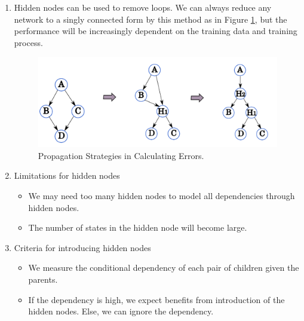 \documentclass[12pt,twoside]{article}
\begin{document}
\begin{enumerate}
\begin{enumerate}
	\end{enumerate}


\item  Hidden nodes can be used to remove loops. We can always reduce any network to a singly connected form by this method as in Figure \ref{fig:ReduceLoops}, but the performance will be increasingly dependent on the training data and training process. 

\begin{figure}[H]		
	\begin{center}
		\includegraphics[width = 0.5\hsize]{./figures/ReducingLoopsFinal.png} 
			\caption{Propagation Strategies in Calculating Errors.}
		\label{fig:ReduceLoops} %
	\end{center}
\end{figure}	

\item Limitations for hidden nodes
	\begin{itemize}
		\item We may need too many hidden nodes to model all dependencies through hidden nodes.
		\item The number of states in the hidden node will become large.
	\end{itemize}

\item Criteria for introducing hidden nodes
	\begin{itemize}
		\item We measure the conditional dependency of each pair of children given the parents. 
		\item If the dependency is high, we expect benefits from introduction of the hidden nodes. Else, we can ignore the dependency.
	\end{itemize}

\end{enumerate}

\newpage
\end{document}

